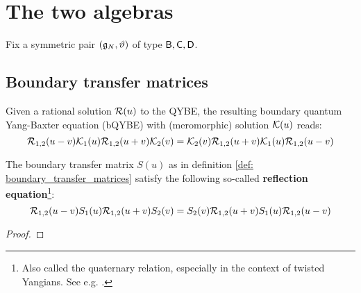     \section{The two algebras}
        Fix a symmetric pair $(\mathfrak{g}_N, \vartheta)$ of type $\mathsf{B}, \mathsf{C}, \mathsf{D}$.
        
        \subsection{Boundary transfer matrices}
            \begin{definition} \label{def: boundary_quantum_yang_baxter_equations}
                Given a rational solution $\mathcal{R}(u)$ to the QYBE, the resulting boundary quantum Yang-Baxter equation (bQYBE) with (meromorphic) solution $\mathcal{K}(u)$ reads:
                    \begin{equation} \label{equation: boundary_quantum_yang_baxter_equations}
                        \mathcal{R}_{1, 2}(u - v) \mathcal{K}_1(u) \mathcal{R}_{1, 2}(u + v) \mathcal{K}_2(v) = \mathcal{K}_2(v) \mathcal{R}_{1, 2}(u + v) \mathcal{K}_1(u) \mathcal{R}_{1, 2}(u - v) 
                    \end{equation}
            \end{definition}
        
            \begin{definition} \label{def: boundary_transfer_matrices}
                
            \end{definition}
            \begin{lemma} \label{lemma: reflection_equations}
                The boundary transfer matrix $S(u)$ as in definition \ref{def: boundary_transfer_matrices} satisfy the following so-called \textbf{reflection equation}\footnote{Also called the quaternary relation, especially in the context of twisted Yangians. See e.g. \cite[Proposition 2.2.1]{molev_yangians_and_classical_lie_algebras}.}:
                    \begin{equation} \label{equation: reflection_equations}
                        \mathcal{R}_{1, 2}(u - v) S_1(u) \mathcal{R}_{1, 2}(u + v) S_2(v) = S_2(v) \mathcal{R}_{1, 2}(u + v) S_1(u) \mathcal{R}_{1, 2}(u - v) 
                    \end{equation}
            \end{lemma}
                \begin{proof}
                    
                \end{proof}
    
